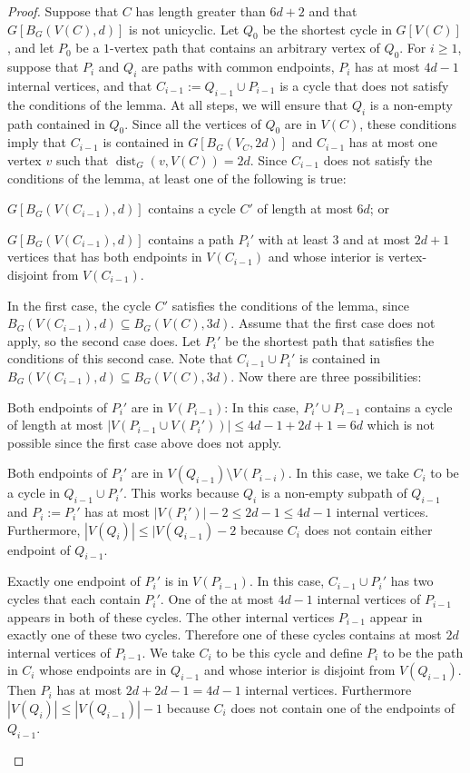 \documentclass{patmorin}
\renewcommand{\ge}{\geqslant}
\renewcommand{\le}{\leqslant}
\DeclareMathOperator{\dist}{dist}
\begin{document}
\begin{proof}
  Suppose that $C$ has length greater than $6d+2$ and that $G[B_G(V(C),d)]$ is not unicyclic.
  Let $Q_0$ be the shortest cycle in $G[V(C)]$, and let $P_0$ be a $1$-vertex path that contains an arbitrary vertex of $Q_0$.  For $i\ge 1$, suppose that $P_i$ and $Q_i$ are paths with common endpoints, $P_i$ has at most $4d-1$ internal vertices, and that $C_{i-1}:=Q_{i-1}\cup P_{i-1}$ is a cycle that does not satisfy the conditions of the lemma.  At all steps, we will ensure that $Q_i$ is a non-empty path contained in $Q_0$.  Since all the vertices of $Q_0$ are in $V(C)$, these conditions imply that $C_{i-1}$ is contained in $G[B_G(V_C,2d)]$ and $C_{i-1}$ has at most one vertex $v$ such that $\dist_G(v,V(C))=2d$.  Since $C_{i-1}$ does not satisfy the conditions of the lemma, at least one of the following is true:
  \begin{compactenum}
    \item $G[B_G(V(C_{i-1}),d)]$ contains a cycle $C'$ of length at most $6d$; or
    \item $G[B_G(V(C_{i-1}),d)]$ contains a path $P_i'$ with at least $3$ and at most $2d+1$ vertices that has both endpoints in $V(C_{i-1})$ and whose interior is vertex-disjoint from $V(C_{i-1})$.
  \end{compactenum}
  In the first case, the cycle $C'$ satisfies the conditions of the lemma, since $B_G(V(C_{i-1}),d)\subseteq B_G(V(C),3d)$.  Assume that the first case does not apply, so the second case does.  Let $P_i'$ be the shortest path that satisfies the conditions of this second case.  Note that $C_{i-1}\cup P_i'$ is contained in $B_G(V(C_{i-1}),d)\subseteq B_G(V(C),3d)$.   Now there are three possibilities:
  \begin{compactenum}
    \item Both endpoints of $P_i'$ are in $V(P_{i-1})$: In this case, $P_i'\cup P_{i-1}$ contains a cycle of length at most $|V(P_{i-1}\cup V(P_i'))|\le 4d-1+2d+1=6d$ which is not possible since the first case above does not apply.
    \item Both endpoints of $P_i'$ are in $V(Q_{i-1})\setminus V(P_{i-i})$.    In this case, we take $C_i$ to be a cycle in $Q_{i-1}\cup P_i'$. This works because $Q_i$ is a non-empty subpath of $Q_{i-1}$ and $P_i:=P_i'$ has at most $|V(P_i')|-2\le 2d-1\le 4d-1$ internal vertices.  Furthermore, $|V(Q_i)|\le |V(Q_{i-1})-2$ because $C_i$ does not contain either endpoint of $Q_{i-1}$.
    \item Exactly one endpoint of $P_i'$ is in $V(P_{i-1})$.  In this case, $C_{i-1}\cup P_i'$ has two cycles that each contain $P_i'$.  One of the at most $4d-1$ internal vertices of $P_{i-1}$ appears in both of these cycles. The other internal vertices $P_{i-1}$ appear in exactly one of these two cycles.  Therefore one of these cycles contains at most $2d$ internal vertices of $P_{i-1}$.  We take $C_i$ to be this cycle and define $P_i$ to be the path in $C_i$ whose endpoints are in $Q_{i-1}$ and whose interior is disjoint from $V(Q_{i-1})$.  Then $P_i$ has at most $2d+2d-1= 4d-1$ internal vertices.  Furthermore $|V(Q_i)|\le |V(Q_{i-1})|-1$ because $C_i$ does not contain one of the endpoints of $Q_{i-1}$.

\end{compactenum}
\end{proof}
\end{document}
